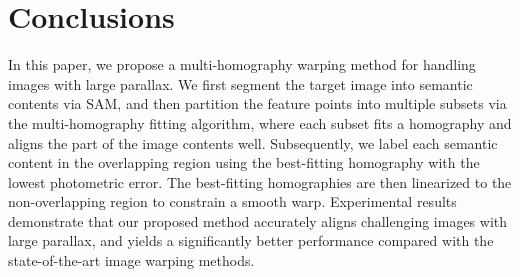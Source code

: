 \documentclass[10pt,twocolumn,letterpaper]{article}
\begin{document}
\section{Conclusions}
\label{sec:conclusion}

In this paper, we propose a multi-homography warping method for handling images with large parallax. We first segment the target image into semantic contents via SAM, and then partition the feature points into multiple subsets via the multi-homography fitting algorithm, where each subset fits a homography and aligns the part of the image contents well. Subsequently, we label each semantic content in the overlapping region using the best-fitting homography with the lowest photometric error. The best-fitting homographies are then linearized to the non-overlapping region to constrain a smooth warp. Experimental results demonstrate that our proposed method accurately aligns challenging images with large parallax, and yields a significantly better performance compared with the state-of-the-art image warping methods.
{
    \small
    
    
}

% 
\end{document}
